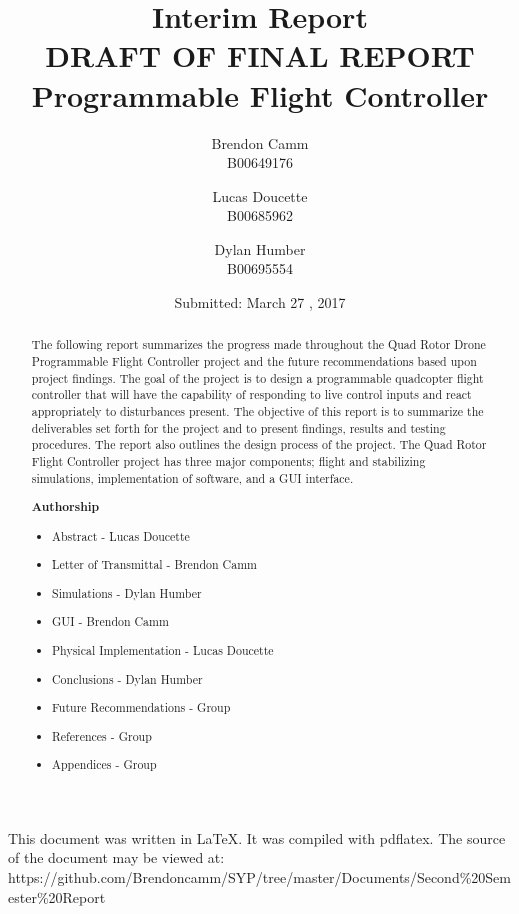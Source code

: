 \documentclass[12pt,letterpaper,titlepage]{article}
\title{Interim Report \\ \small DRAFT OF FINAL REPORT \\ Programmable Flight Controller}
\author{Brendon Camm \\ B00649176 \and Lucas Doucette \\ B00685962 \and Dylan Humber \\ B00695554}
\date{Submitted: March 27 , 2017}
\begin{document}
	\maketitle
	\newpage
	\vspace*{2in}
	This document was written in \LaTeX.  It was compiled with pdflatex.  The source of the document may be viewed at: \newline\small	https://github.com/Brendoncamm/SYP/tree/master/Documents/Second\%20Semester\%20Report
	\vspace*{4in}
	\pagebreak


	\newpage
	\begin{abstract} %
	The following report summarizes the progress made throughout the Quad Rotor Drone Programmable Flight Controller project and the future recommendations based upon project findings. The goal of the project is to design a programmable quadcopter flight controller that will have the capability of responding to live control inputs and react appropriately to disturbances present. The objective of this report is to summarize the deliverables set forth for the project and to present findings, results and testing procedures. The report also outlines the design process of the project. The Quad Rotor Flight Controller project has three major components; flight and stabilizing simulations, implementation of software, and a GUI interface.  
	\vspace{0.2in}	
	
	\textbf{Authorship}
	\begin{itemize}
		\itemsep-.5em
		\item{Abstract - Lucas Doucette}
		\item{Letter of Transmittal - Brendon Camm}
		\item{Simulations - Dylan Humber}
		\item{GUI - Brendon Camm}
		\item{Physical Implementation - Lucas Doucette}
		\item{Conclusions - Dylan Humber}
		\item{Future Recommendations - Group}
		\item{References - Group}
		\item{Appendices - Group}
	\end{itemize}
	
	\end{abstract}
	\setcounter{tocdepth}{2}
	\setcounter{tocdepth}{3}
	\tableofcontents
	\pagebreak
	
\end{document}
